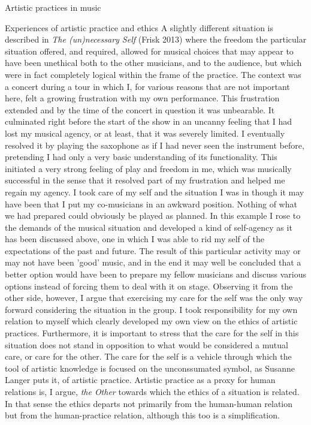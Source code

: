 \documentclass[presentation]{beamer}
\makeatletter
\newcommand{\cslcitation}[2]
 {\protect\hyper@linkstart{cite}{citeproc_bib_item_#1}#2\hyper@linkend}
\makeatother
\begin{document}
\begin{frame}[label={sec:org952e88c}]{Artistic practices in music}
\begin{block}{Experiences of artistic practice and ethics}
A slightly different situation is described in \emph{The (un)necessary Self} (\cslcitation{8}{Frisk 2013}) where the freedom the particular situation offered, and required, allowed for musical choices that may appear to have been unethical both to the other musicians, and to the audience, but which were in fact completely logical within the frame of the practice. The context was a concert during a tour in which I, for various reasons that are not important here, felt a growing frustration with my own performance. This frustration extended and by the time of the concert in question it was unbearable. It culminated right before the start of the show in an uncanny feeling that I had lost my musical agency, or at least, that it was severely limited. I eventually resolved it by playing the saxophone as if I had never seen the instrument before, pretending I had only a very basic understanding of its functionality. This initiated a very strong feeling of play and freedom in me, which was musically successful in the sense that it resolved part of my frustration and helped me regain my agency. I took care of my self and the situation I was in though it may have been that I put my co-musicians in an awkward position. Nothing of what we had prepared could obviously be played as planned. In this example I rose to the demands of the musical situation and developed a kind of self-agency as it has been discussed above, one in which I was able to rid my self of the expectations of the past and future. The result of this particular activity may or may not have been 'good' music, and  in the end it may well be concluded that a better option would have been to prepare my fellow musicians and discuss various options instead of forcing them to deal with it on stage. Observing it from the other side, however, I argue that exercising my care for the self was the only way forward considering the situation in the group. I took responsibility for my own relation to myself which clearly developed my own view on the ethics of artistic practices. Furthermore, it is important to stress that the care for the self in this situation does not stand in opposition to what would be considered a mutual care, or care for the other. The care for the self is a vehicle through which the tool of artistic knowledge is focused on the unconssumated symbol, as Susanne Langer puts it, of artistic practice.
Artistic practice as a proxy for human relations is, I argue, \emph{the Other} towards which the ethics of a situation is related.
In that sense the ethics departs not primarily from the human-human relation but from the human-practice relation, although this too is a simplification. 


\end{block}
\end{frame}
\end{document}
